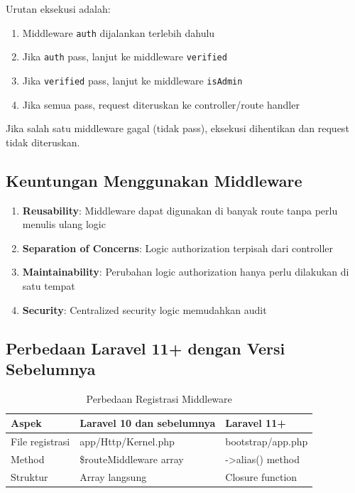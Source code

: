 \documentclass[a4paper,oneside,11pt]{book}
\begin{document}
Urutan eksekusi adalah:
\begin{enumerate}
    \item Middleware \texttt{auth} dijalankan terlebih dahulu
    \item Jika \texttt{auth} pass, lanjut ke middleware \texttt{verified}
    \item Jika \texttt{verified} pass, lanjut ke middleware \texttt{isAdmin}
    \item Jika semua pass, request diteruskan ke controller/route handler
\end{enumerate}

Jika salah satu middleware gagal (tidak pass), eksekusi dihentikan dan request tidak diteruskan.

\subsection{Keuntungan Menggunakan Middleware}

\begin{enumerate}
    \item \textbf{Reusability}: Middleware dapat digunakan di banyak route tanpa perlu menulis ulang logic
    \item \textbf{Separation of Concerns}: Logic authorization terpisah dari controller
    \item \textbf{Maintainability}: Perubahan logic authorization hanya perlu dilakukan di satu tempat
    \item \textbf{Security}: Centralized security logic memudahkan audit
\end{enumerate}

\subsection{Perbedaan Laravel 11+ dengan Versi Sebelumnya}

\begin{table}[H]
\centering
\begin{tabular}{|l|l|l|}
\hline
\textbf{Aspek} & \textbf{Laravel 10 dan sebelumnya} & \textbf{Laravel 11+} \\
\hline
File registrasi & app/Http/Kernel.php & bootstrap/app.php \\
Method & \$routeMiddleware array & ->alias() method \\
Struktur & Array langsung & Closure function \\
\hline
\end{tabular}
\caption{Perbedaan Registrasi Middleware}
\end{table}
\end{document}
